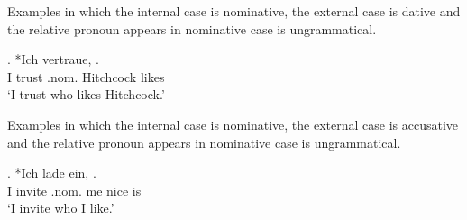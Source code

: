 Examples in which the internal case is nominative, the external case is dative and the relative pronoun appears in nominative case is ungrammatical.

\exg. *Ich vertraue,   .\\
 I trust\scsub{[dat]} .\ac{nom}. Hitchcock likes\scsub{[nom]}\\
 `I trust who likes Hitchcock.' 

Examples in which the internal case is nominative, the external case is accusative and the relative pronoun appears in nominative case is ungrammatical.

\exg. *Ich {lade ein},    .\\
 I invite\scsub{[acc]} .\ac{nom}. me nice is\scsub{[nom]}\\
 `I invite who I like.' 

\phantom{x}
